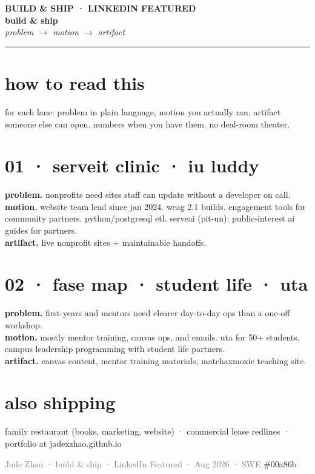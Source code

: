\documentclass[11pt,letterpaper]{article}
\begin{document}
{\color{jade}\footnotesize\bfseries BUILD \& SHIP · LINKEDIN FEATURED}\\[0.4em]
{\color{jade}\LARGE\bfseries build \& ship}\\[0.25em]
{\large\itshape problem $\rightarrow$ motion $\rightarrow$ artifact}\\[0.5em]
{\color{jade}\rule{\textwidth}{1.4pt}}

\section*{how to read this}
for each lane: problem in plain language, motion you actually ran, artifact someone else can open.
numbers when you have them. no deal-room theater.

\section*{01 · serveit clinic · iu luddy}
\textbf{problem.} nonprofits need sites staff can update without a developer on call.\\
\textbf{motion.} website team lead since jan 2024. wcag 2.1 builds. engagement tools for community partners. python/postgresql etl. serveai (pit-un): public-interest ai guides for partners.\\
\textbf{artifact.} live nonprofit sites + maintainable handoffs.

\section*{02 · fase map · student life · uta}
\textbf{problem.} first-years and mentors need clearer day-to-day ops than a one-off workshop.\\
\textbf{motion.} mostly mentor training, canvas ops, and emails. uta for 50+ students. campus leadership programming with student life partners.\\
\textbf{artifact.} canvas content, mentor training materials, matchaxmoxie teaching site.

\section*{also shipping}
family restaurant (books, marketing, website) · commercial lease redlines · portfolio at jadexzhao.github.io

\vspace*{\fill}
\noindent\textcolor{gray}{\footnotesize Jade Zhao · build \& ship · LinkedIn Featured · Aug 2026 · SWE}
\hfill\textcolor{jade}{\footnotesize \#00a86b}
\end{document}
